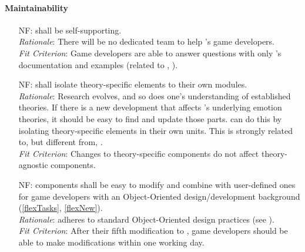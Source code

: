 \paragraph{Maintainability}
\noindent \begin{itemize}[wide=0pt, leftmargin=*]

    \item[NF\refstepcounter{nfnum}\thenfnum \label{N_Support}:] \progname{}
    shall be self-supporting. \vspace*{1mm}\\
    \textit{Rationale}: There will be no dedicated team to help \progname{}'s
    game developers. \vspace*{1mm}\\
    \textit{Fit Criterion}: Game developers are able to answer questions with
    only \progname{}'s documentation and examples (related to
    , ).

    \item[NF\refstepcounter{nfnum}\thenfnum \label{N_Evolve}:] \progname{}
    shall isolate theory-specific elements to their own modules. \vspace*{1mm}\\
    \textit{Rationale}: Research evolves, and so does one's understanding of
    established theories. If there is a new development that affects
    \progname{}'s underlying emotion theories, it should be easy to find and
    update those parts. \progname{} can do this by isolating theory-specific
    elements in their own units. This is strongly related to, but different
    from, . \vspace*{1mm}\\
    \textit{Fit Criterion}: Changes to theory-specific components do not affect
    theory-agnostic components.

    \item[NF\refstepcounter{nfnum}\thenfnum \label{N_Mod}:]  \progname{}
    components shall be easy to modify and combine with user-defined ones for
    game developers with an Object-Oriented design/development background
    (\ref{flexTasks}, \ref{flexNew}). \vspace*{1mm}\\
    \textit{Rationale}: \progname{} adheres to standard Object-Oriented design
    practices (see ). \vspace*{1mm}\\
    \textit{Fit Criterion}: After their fifth modification to \progname{}, game
    developers should be able to make modifications within one working day.


\end{itemize}

